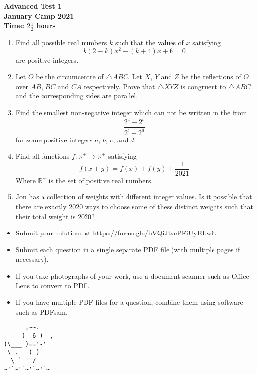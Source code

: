 \documentclass{article}
\begin{document}
\thispagestyle{empty}

\begin{center}
  \textbf{\Large Advanced Test 1}
  \\ \vspace{1em}
  \textbf{\large January Camp 2021}
  \\ \vspace{1em}
  \textbf{\large Time: $2\frac{1}{2}$ hours}
\end{center}

\vspace{24pt}

\begin{enumerate}[1.]

\item %
Find all possible real numbers $k$ such that the values of $x$ satisfying
$$k(2 - k)x^2 - (k + 4)x + 6 = 0$$
are positive integers.


\item %
Let $O$ be the circumcentre of $\triangle ABC$. Let $X$, $Y$ and $Z$ be the reflections of $O$ over $AB$, $BC$ and $CA$ respectively. Prove that $\triangle XYZ$ is congruent to $\triangle ABC$ and the corresponding sides are parallel.


\item %
Find the smallest non-negative integer which can not be written in the from
\[
  \frac{2^a - 2^b}{2^c - 2^d}
\]
for some positive integers $a$, $b$, $c$, and $d$.


\item %
Find all functions $f: \mathbb{R}^+ \rightarrow \mathbb{R}^+$ satisfying 
$$f(x + y) = f(x) + f(y) + \frac{1}{2021} $$
Where $\mathbb{R}^+$ is the set of positive real numbers. 

\item %
Jon has a collection of weights with different integer values. Is it possible that there are exactly $2020$ ways to choose some of these distinct weights such that their total weight is $2020$?

\end{enumerate}


\vfill
\begin{itemize}
	\item Submit your solutions at https://forms.gle/bVQiJtvePFiUyBLw6.
	\item Submit each question in a single separate PDF file (with multiple pages if necessary).
	\item If you take photographs of your work, use a document scanner such as Office Lens to convert to PDF.
	\item If you have multiple PDF files for a question, combine them using software such as PDFsam.
\end{itemize}

\vfill
\centering
\begin{BVerbatim}
      ,~~.
     (  6 )-_,
(\___ )=='-'
 \ .   ) )
  \ `-' /    
~'`~'`~'`~'`~
\end{BVerbatim}
\end{document}
